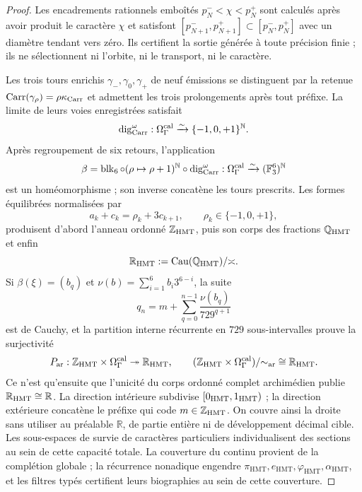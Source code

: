 \begin{proof}
Les encadrements rationnels emboîtés
\(
 p_N^-<\chi<p_N^+
\)
sont calculés après avoir produit le caractère \(\chi\) et satisfont
\(
 [p_{N+1}^-,p_{N+1}^+]\subset[p_N^-,p_N^+]
\)
avec un diamètre tendant vers zéro. Ils certifient la sortie générée à toute
précision finie ; ils ne sélectionnent ni l'orbite, ni le transport, ni le caractère.

Les trois tours enrichis \(\gamma_{-},\gamma_0,\gamma_+\) de neuf
émissions se distinguent par la retenue
\(\operatorname{Carr}(\gamma_\rho)=\rho\kappa_{\rm Carr}\) et admettent les
trois prolongements après tout préfixe. La limite de leurs voies
enregistrées satisfait
\[
 \operatorname{dig}_{\rm Carr}^{\omega}:
 \Omega_\Gamma^{\rm cal}\xrightarrow{\sim}
 \{-1,0,+1\}^{\mathbb N}.
\]
Après regroupement de six retours, l'application
\[
 \beta=\operatorname{blk}_6\circ
 (\rho\mapsto\rho+1)^{\mathbb N}\circ
 \operatorname{dig}_{\rm Carr}^{\omega}:
 \Omega_\Gamma^{\rm cal}\xrightarrow{\sim}
 (\mathbb F_3^6)^{\mathbb N}
\]
est un homéomorphisme ; son inverse concatène les tours prescrits. Les formes
équilibrées normalisées par
\[
 a_k+c_k=\rho_k+3c_{k+1},\qquad
 \rho_k\in\{-1,0,+1\},
\]
produisent d'abord l'anneau ordonné \(\mathbb Z_{\rm HMT}\), puis son
corps des fractions \(\mathbb Q_{\rm HMT}\) et enfin
\[
 \mathbb R_{\rm HMT}:=
 \operatorname{Cau}(\mathbb Q_{\rm HMT})/{\asymp}.
\]
Si \(\beta(\xi)=(b_q)\) et
\(\nu(b)=\sum_{i=1}^{6}b_i3^{6-i}\), la suite
\[
 q_n=m+\sum_{q=0}^{n-1}\frac{\nu(b_q)}{729^{q+1}}
\]
est de Cauchy, et la partition interne récurrente en \(729\) sous-intervalles
prouve la surjectivité
\[
 P_{\rm ar}:\mathbb Z_{\rm HMT}\times\Omega_\Gamma^{\rm cal}
 \twoheadrightarrow\mathbb R_{\rm HMT},\qquad
 (\mathbb Z_{\rm HMT}\times\Omega_\Gamma^{\rm cal})/{\sim_{\rm ar}}
 \cong\mathbb R_{\rm HMT}.
\]
Ce n'est qu'ensuite que l'unicité du corps ordonné complet archimédien publie
\(\mathbb R_{\rm HMT}\cong\mathbb R\). La direction intérieure subdivise
\([0_{\rm HMT},1_{\rm HMT})\) ; la direction extérieure concatène le préfixe qui code
\(m\in\mathbb Z_{\rm HMT}\). On couvre ainsi la droite sans utiliser au préalable
\(\mathbb R\), de partie entière ni de développement décimal cible.
Les sous-espaces de survie de caractères particuliers individualisent
des sections au sein de cette capacité totale. La couverture du continu provient
de la complétion globale ; la récurrence nonadique engendre
\(\pi_{\mathrm{HMT}},e_{\mathrm{HMT}},\varphi_{\mathrm{HMT}},
\alpha_{\mathrm{HMT}}\), et les filtres typés certifient leurs biographies
au sein de cette couverture.


\end{proof}

